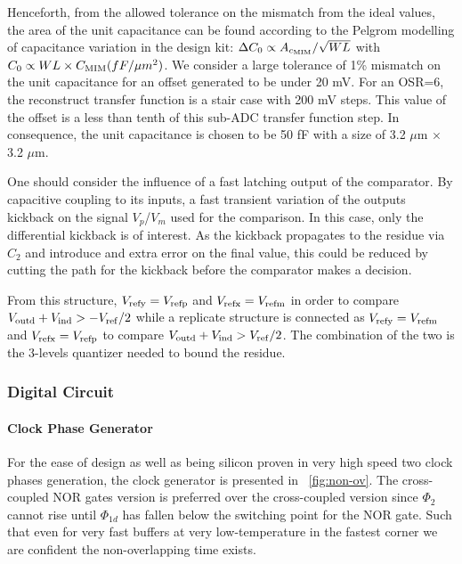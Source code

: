 Henceforth, from the allowed tolerance on the mismatch from the ideal values, the area of the unit capacitance can be found according to the Pelgrom modelling of capacitance variation in the design kit: \(\Delta C_0 \propto A_{c_{\rm MIM}}/\sqrt{WL} \) with \(C_0 \propto WL\times C_{\rm MIM}(fF/\mu m^2)\). We consider a large tolerance of 1\% mismatch on the unit capacitance for an offset generated to be under 20 mV. For an OSR=6, the reconstruct transfer function is a stair case with 200 mV steps. This value of the offset is a less than tenth of this sub-ADC transfer function step. In consequence, the unit capacitance is chosen to be 50 fF with a size of 3.2 $\mu$m $\times$ 3.2 $\mu$m.

One should consider the influence of a fast latching output of the comparator. By capacitive coupling to its inputs, a fast transient variation of the outputs kickback on the signal \(V_p\)/\(V_m\) used for the comparison. In this case, only the differential kickback is of interest. As the kickback propagates to the residue via \(C_2\) and introduce and extra error on the final value, this could be reduced by cutting the path for the kickback before the comparator makes a decision.

From this structure, \(V_{\rm refy} = V_{\rm refp}\) and \(V_{\rm refx} = V_{\rm refm}\) in order to compare \(V_{\rm outd}+V_{\rm ind} > - V_{\rm ref}/2\) while a replicate structure is connected as \(V_{\rm refy} = V_{\rm refm}\) and \(V_{\rm refx} = V_{\rm refp}\) to compare \(V_{\rm outd}+V_{\rm ind} > V_{\rm ref}/2\). The combination of the two is the 3-levels quantizer needed to bound the residue.

	\subsubsection{Digital Circuit}         %
\paragraph{Clock Phase Generator}   %

For the ease of design as well as being silicon proven in very high speed two clock phases generation, the clock generator is presented in \figurename~\ref{fig:non-ov}. The cross-coupled NOR gates version is preferred over the cross-coupled version since \(\Phi_2 \) cannot rise until \(\Phi_{1d} \) has fallen below
the switching point for the NOR gate. Such that even for very fast buffers at very low-temperature in the fastest corner we are confident the non-overlapping time exists. 
	
